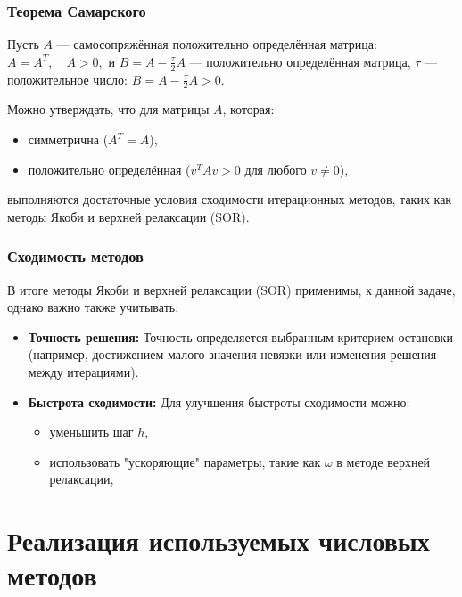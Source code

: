 \documentclass[a4paper, fleqn]{report}
\begin{document}
\subsection*{Теорема Самарского}
Пусть $A$ — самосопряжённая положительно определённая матрица:  
$A = A^T, \quad A > 0,$  
и $B = A - \frac{\tau}{2} A$ — положительно определённая матрица, $\tau$ — положительное число:  
$B = A - \frac{\tau}{2} A > 0.$

Можно утверждать, что для матрицы $A$, которая:
\begin{itemize}
    \item симметрична ($A^T = A$),
    \item положительно определённая ($v^T A v > 0$ для любого $v \neq 0$),
\end{itemize}
выполняются достаточные условия сходимости итерационных методов, таких как методы Якоби и верхней релаксации (SOR). 

\subsection*{Сходимость методов}
В итоге методы Якоби и верхней релаксации (SOR) применимы, к данной задаче, однако важно также учитывать:
\begin{itemize}
    \item \textbf{Точность решения:} Точность определяется выбранным критерием остановки (например, достижением малого значения невязки или изменения решения между итерациями).
    \item \textbf{Быстрота сходимости:} Для улучшения быстроты сходимости можно:
    \begin{itemize}
        \item уменьшить шаг $h$,
        \item использовать "ускоряющие" параметры, такие как $\omega$ в методе верхней релаксации,
    \end{itemize}
\end{itemize}

\chapter{Реализация используемых числовых методов}
\end{document}
